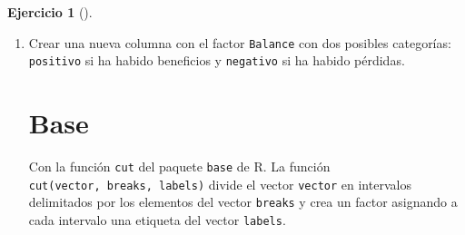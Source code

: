 \documentclass[
  spanish,
  a4paper,
]{scrreport}
\newenvironment{Shaded}{\begin{snugshade}}{\end{snugshade}}
\newcommand{\AttributeTok}[1]{\textcolor[rgb]{0.40,0.45,0.13}{#1}}
\newcommand{\FunctionTok}[1]{\textcolor[rgb]{0.28,0.35,0.67}{#1}}
\newcommand{\NormalTok}[1]{\textcolor[rgb]{0.00,0.23,0.31}{#1}}
\newcommand{\OtherTok}[1]{\textcolor[rgb]{0.00,0.23,0.31}{#1}}
\newcommand{\SpecialCharTok}[1]{\textcolor[rgb]{0.37,0.37,0.37}{#1}}
\theoremstyle{definition}
\newtheorem{exercise}{Ejercicio}[chapter]
\theoremstyle{remark}
\begin{document}
\begin{exercise}[]
\begin{enumerate}
\begin{tcolorbox}
  Con la función
  \href{https://dplyr.tidyverse.org/reference/mutate.html}{\texttt{mutate}}
  del paquete \texttt{dplyr} de \texttt{tidyverse}. La función
  \texttt{mutate} permite añadir nuevas columnas a un data frame
  mediante una fórmula puede hacer referencia a las columnas existentes.

\begin{Shaded}
\begin{Highlighting}[]
\FunctionTok{library}\NormalTok{(tidyverse)}
\NormalTok{df }\OtherTok{\textless{}{-}}\NormalTok{ df }\SpecialCharTok{|\textgreater{}}
    \FunctionTok{mutate}\NormalTok{(}\AttributeTok{Beneficios =}\NormalTok{ Ingresos }\SpecialCharTok{{-}}\NormalTok{ Gastos }\SpecialCharTok{{-}}\NormalTok{ Impuestos)}
\NormalTok{df}
\end{Highlighting}
\end{Shaded}

\begin{verbatim}
      Mes Ingresos Gastos Impuestos Beneficios
1   Enero    45000  33400      6450       5150
2 Febrero    41500  35400      6300       -200
3   Marzo    51200  35600      7100       8500
4   Abril    49700  36300      6850       6550
\end{verbatim}

  \end{tcolorbox}
\item
  Crear una nueva columna con el factor \texttt{Balance} con dos
  posibles categorías: \texttt{positivo} si ha habido beneficios y
  \texttt{negativo} si ha habido pérdidas.

  \begin{tcolorbox}[enhanced jigsaw, titlerule=0mm, arc=.35mm, rightrule=.15mm, opacitybacktitle=0.6, leftrule=.75mm, colframe=quarto-callout-tip-color-frame, toptitle=1mm, breakable, colbacktitle=quarto-callout-tip-color!10!white, bottomrule=.15mm, colback=white, left=2mm, bottomtitle=1mm, opacityback=0, title=\textcolor{quarto-callout-tip-color}{\faLightbulb}\hspace{0.5em}{Solución}, toprule=.15mm, coltitle=black]

  \section{Base}

  Con la función \texttt{cut} del paquete \texttt{base} de R. La función
  \texttt{cut(vector,\ breaks,\ labels)} divide el vector
  \texttt{vector} en intervalos delimitados por los elementos del vector
  \texttt{breaks} y crea un factor asignando a cada intervalo una
  etiqueta del vector \texttt{labels}.


\end{tcolorbox}
\end{enumerate}
\end{exercise}
\end{document}
